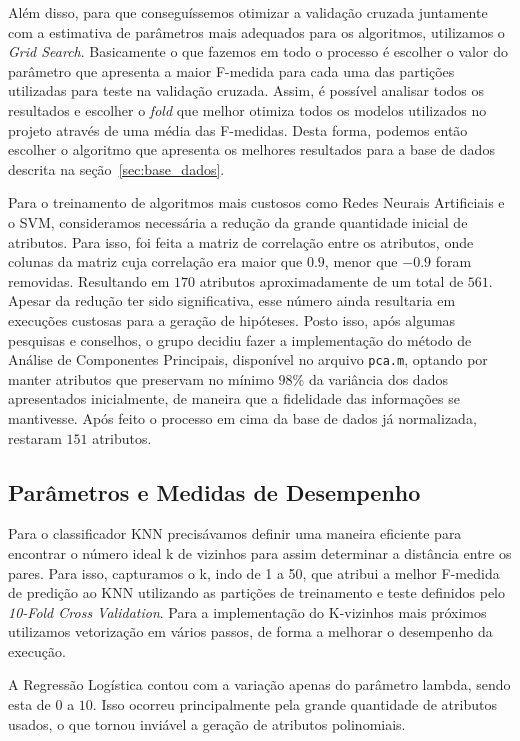 \documentclass[10pt, conference, compsocconf]{IEEEtran}
\begin{document}
Além disso, para que conseguíssemos otimizar a validação cruzada juntamente 
com a estimativa de parâmetros mais adequados para os algoritmos, utilizamos 
o \textit{Grid Search}. Basicamente o que fazemos em todo o processo é escolher 
o valor do parâmetro que apresenta a maior F-medida para cada uma das partições 
utilizadas para teste na validação cruzada. Assim, é possível analisar todos os
resultados e escolher o \textit{fold} que melhor otimiza todos os modelos 
utilizados no projeto através de uma média das F-medidas. Desta forma, podemos
então escolher o algoritmo que apresenta os melhores resultados para a base de
dados descrita na seção~\ref{sec:base_dados}.

Para o treinamento de algoritmos mais custosos como Redes Neurais Artificiais 
e o SVM, consideramos necessária a redução da grande quantidade inicial de 
atributos. Para isso, foi feita a matriz de correlação entre os atributos, onde
colunas da matriz cuja correlação era maior que $0.9$, menor que $-0.9$ foram 
removidas. Resultando em $170$ atributos aproximadamente de um total de $561$. 
Apesar da redução ter sido significativa, esse número ainda resultaria em 
execuções custosas para a geração de hipóteses. Posto isso, após algumas 
pesquisas e conselhos, o grupo decidiu fazer a implementação do método de 
Análise de Componentes Principais, disponível no arquivo \texttt{pca.m}, optando por manter atributos que preservam 
no mínimo $98\%$ da variância dos dados apresentados inicialmente, de maneira 
que a fidelidade das informações se mantivesse. Após feito o processo em cima 
da base de dados já normalizada, restaram $151$ atributos.


\subsection{Parâmetros e Medidas de Desempenho}
Para o classificador KNN precisávamos definir uma maneira eficiente para 
encontrar o número ideal k de vizinhos para assim determinar a distância entre 
os pares. Para isso, capturamos o k, indo de 1 a 50, que atribui a melhor 
F-medida de predição ao KNN utilizando as partições de treinamento e teste 
definidos pelo \textit{10-Fold Cross Validation}. Para a implementação do 
K-vizinhos mais próximos utilizamos vetorização em vários passos, de forma a melhorar o desempenho da execução.

A Regressão Logística contou com a variação apenas do parâmetro lambda, sendo
esta de $0$ a $10$. Isso
ocorreu principalmente pela grande quantidade de atributos usados, o que tornou
inviável a geração de atributos polinomiais. 
\end{document}
